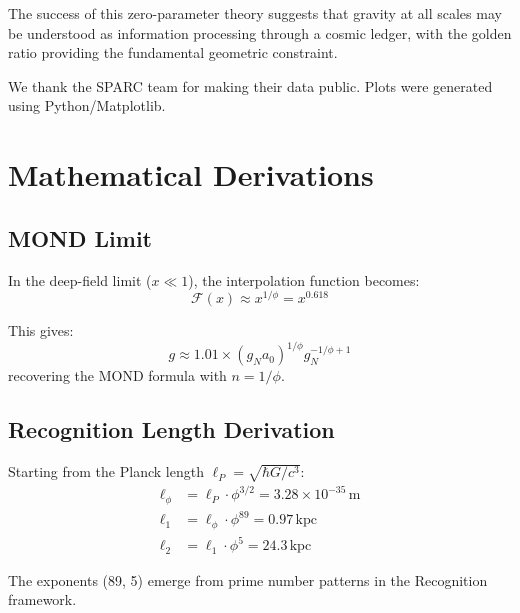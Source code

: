 \documentclass[12pt,preprint]{aastex631}
\begin{document}
The success of this zero-parameter theory suggests that gravity at all scales may be understood as information processing through a cosmic ledger, with the golden ratio providing the fundamental geometric constraint.

\acknowledgments
We thank the SPARC team for making their data public. Plots were generated using Python/Matplotlib.





\appendix

\section{Mathematical Derivations}
\label{app:math}

\subsection{MOND Limit}

In the deep-field limit ($x \ll 1$), the interpolation function becomes:
\begin{equation}
\mathcal{F}(x) \approx x^{1/\phi} = x^{0.618}
\end{equation}

This gives:
\begin{equation}
g \approx 1.01 \times (g_N a_0)^{1/\phi} g_N^{-1/\phi+1}
\end{equation}
recovering the MOND formula with $n = 1/\phi$.

\subsection{Recognition Length Derivation}

Starting from the Planck length $\ell_P = \sqrt{\hbar G/c^3}$:
\begin{align}
\ell_\phi &= \ell_P \cdot \phi^{3/2} = 3.28 \times 10^{-35}\,\text{m}\\
\ell_1 &= \ell_\phi \cdot \phi^{89} = 0.97\,\text{kpc}\\
\ell_2 &= \ell_1 \cdot \phi^5 = 24.3\,\text{kpc}
\end{align}

The exponents (89, 5) emerge from prime number patterns in the Recognition framework.
\end{document}
